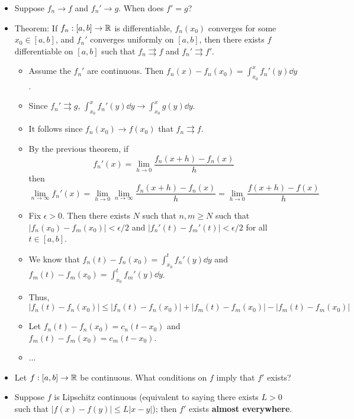 \documentclass[../../notes.tex]{subfiles}
\begin{document}
\begin{itemize}
    \item {}Suppose $f_n\to f$ and $f_n'\to g$. When does $f'=g$?
    \item Theorem: If $f_n:[a,b]\to\mathbb{R}$ is differentiable, $f_n(x_0)$ converges for some $x_0\in[a,b]$, and $f_n'$ converges uniformly on $[a,b]$, then there exists $f$ differentiable on $[a,b]$ such that $f_n\rightrightarrows f$ and $f_n'\rightrightarrows f'$.
    \begin{itemize}
        \item Assume the $f_n'$ are continuous. Then $f_n(x)-f_n(x_0)=\int_{x_0}^xf_n'(y)\dd{y}$.
        \item Since $f_n'\rightrightarrows g$, $\int_{x_0}^xf_n'(y)\dd{y}\to\int_{x_0}^xg(y)\dd{y}$.
        \item It follows since $f_n(x_0)\to f(x_0)$ that $f_n\rightrightarrows f$.
        \item By the previous theorem, if
        \begin{equation*}
            f_n'(x) = \lim_{h\to 0}\frac{f_n(x+h)-f_n(x)}{h}
        \end{equation*}
        then
        \begin{equation*}
            \lim_{n\to\infty}f_n'(x) = \lim_{h\to 0}\lim_{n\to\infty}\frac{f_n(x+h)-f_n(x)}{h} = \lim_{h\to 0}\frac{f(x+h)-f(x)}{h}
        \end{equation*}
        \item Fix $\epsilon>0$. Then there exists $N$ such that $n,m\geq N$ such that $|f_n(x_0)-f_m(x_0)|<\epsilon/2$ and $|f_n'(t)-f_m'(t)|<\epsilon/2$ for all $t\in[a,b]$.
        \item We know that $f_n(t)-f_n(x_0)=\int_{x_0}^tf_n'(y)\dd{y}$ and $f_m(t)-f_m(x_0)=\int_{x_0}^tf_m'(y)\dd{y}$.
        \item Thus,
        \begin{equation*}
            |f_n(t)-f_n(x_0)| \leq |f_n(t)-f_n(x_0)|+|f_m(t)-f_m(x_0)|-|f_m(t)-f_m(x_0)|
        \end{equation*}
        \item Let $f_n(t)-f_n(x_0)=c_n(t-x_0)$ and $f_m(t)-f_m(x_0)=c_m(t-x_0)$.
        \item ...
    \end{itemize}
    \item Let $f:[a,b]\to\mathbb{R}$ be continuous. What conditions on $f$ imply that $f'$ exists?
    \item Suppose $f$ is Lipschitz continuous (equivalent to saying there exists $L>0$ such that $|f(x)-f(y)|\leq L|x-y|$); then $f'$ exists \textbf{almost everywhere}.

\end{itemize}
\end{document}
